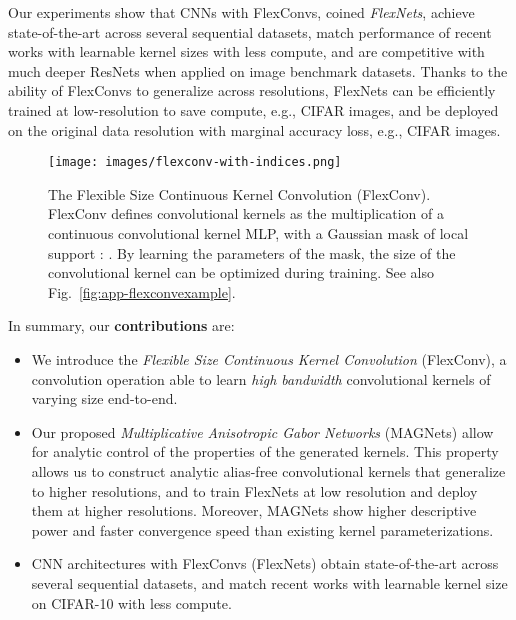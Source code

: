 \documentclass{article} \usepackage{iclr2022_conference,times}
\newcommand{\mlp}{{\btt MLP}}
\newcommand{\mlppsi}{\mlp}
\begin{document}
Our experiments show that CNNs with FlexConvs, coined \textit{FlexNets}, achieve state-of-the-art across several sequential datasets, match performance of recent works with learnable kernel sizes with less compute, and are competitive with much deeper ResNets \citep{he2016deep} when applied on image benchmark datasets. Thanks to the ability of FlexConvs to generalize across resolutions, FlexNets can be efficiently trained at low-resolution to save compute, e.g.,  CIFAR images, and be deployed on the original data resolution with marginal accuracy loss, e.g.,  CIFAR images.\begin{figure}[t]
    \centering
\texttt{[image: images/flexconv-with-indices.png]}
    \vspace{-3mm}
    \caption{The Flexible Size Continuous Kernel Convolution (FlexConv). FlexConv defines convolutional kernels as the multiplication of a continuous convolutional kernel \mlppsi, with a Gaussian mask of local support : . By learning the parameters of the mask, the size of the convolutional kernel can be optimized during training. See also Fig.~\ref{fig:app-flexconvexample}.
    \vspace{-2mm}}
    \label{fig:flexconv}
\end{figure}

In summary, our \textbf{contributions} are:
\begin{itemize}[topsep=0pt, leftmargin=*]
    \item We introduce the \textit{Flexible Size Continuous Kernel Convolution} (FlexConv), a convolution operation able to learn \emph{high bandwidth} convolutional kernels of varying size end-to-end. 
    \item Our proposed \textit{Multiplicative Anisotropic Gabor Networks} (MAGNets) allow for analytic control of the properties of the generated kernels. This property allows us to construct analytic alias-free convolutional kernels that generalize to higher resolutions, and to train FlexNets at low resolution and deploy them at higher resolutions. Moreover, MAGNets show higher descriptive power and faster convergence speed than existing kernel parameterizations.
    \item CNN architectures with FlexConvs (FlexNets) obtain state-of-the-art across several sequential datasets, and match recent works with learnable kernel size on CIFAR-10 with less compute.
\end{itemize}
\vspace{-2mm}
\end{document}

